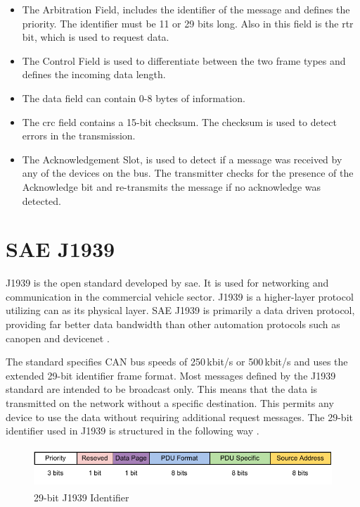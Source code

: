 \begin{itemize}
		\item The Arbitration Field, includes the identifier of the message and defines the priority. The identifier must be 11 or 29 bits long. Also in this field is the \acrfull{rtr} bit, which is used to request data.
		\item The Control Field is used to differentiate between the two frame types and defines the incoming data length.
		\item The data field can contain 0-8 bytes of information.
		\item The \acrshort{crc} field contains a 15-bit checksum. The checksum is used to detect errors in the transmission.
		\item The Acknowledgement Slot, is used to detect if a message was received by any of the devices on the bus. The transmitter checks for the presence of the Acknowledge bit and re-transmits the message if no acknowledge was detected.
\end{itemize}
\newpage

\section{SAE J1939}
J1939 is the open standard developed by \acrfull{sae}. It is used for networking and communication in the commercial vehicle sector. J1939 is a higher-layer protocol utilizing \acrshort{can} as its physical layer. SAE J1939 is primarily a data driven protocol, providing far better data bandwidth than other automation protocols such as \gls{canopen} and \gls{devicenet} \cite{introduction_sae_j1939_protocol}.

The standard specifies CAN bus speeds of 250\,kbit/s or 500\,kbit/s and uses the extended 29-bit identifier frame format. Most messages defined by the J1939 standard are intended to be broadcast only. This means that the data is transmitted on the network without a specific destination. This permits any device to use the data without requiring additional request messages. The 29-bit identifier used in J1939 is structured in the following way \cite{sae_j1939_introduction}. 

\begin{figure}[h!]
	\centering
	\includegraphics[height=1.5cm]{images/j1939-identifier}
	\caption{29-bit J1939 Identifier}
	\label{fig:29-bit_J1939_Identifier}
\end{figure}

